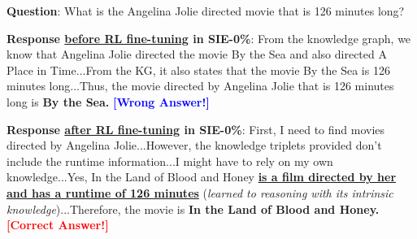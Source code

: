 \documentclass{article} %
\begin{document}
\begin{tcolorbox}[
  breakable,
  colback=gray!10,
  colframe=gray!60,
  title=Case study before and after RL fine-tuning in SIE,
  left=6pt,right=6pt,top=4pt,bottom=4pt,
  fontupper=\scriptsize
]
\textbf{Question}: What is the Angelina Jolie directed movie that is 126 minutes long?
\vspace{2pt}

\textbf{Response \underline{before RL fine-tuning} in SIE-0\%}:
From the knowledge graph, we know that Angelina Jolie directed the movie By the Sea and also directed A Place in Time...From the KG, it also states that the movie By the Sea is 126 minutes long...Thus, the movie directed by Angelina Jolie that is 126 minutes long is \textbf{By the Sea.} \quad \textcolor{blue}{\textbf{[Wrong Answer!]}}
\vspace{2pt}

\textbf{Response \underline{after RL fine-tuning} in SIE-0\%}:
First, I need to find movies directed by Angelina Jolie...However, the knowledge triplets provided don't include the runtime information...I might have to rely on my own knowledge...Yes, In the Land of Blood and Honey \underline{\textbf{is a film directed by her and has a runtime of 126 minutes}} (\textit{learned to reasoning with its intrinsic knowledge})...Therefore, the movie is \textbf{In the Land of Blood and Honey.} \quad \textcolor{red}{\textbf{[Correct Answer!]}}

\end{tcolorbox}
\end{document}
